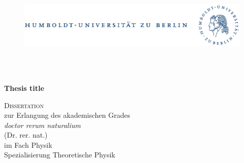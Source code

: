 \begin{titlepage}
  \begin{center}
    
    \vspace{-2cm}
    \begin{figure}[ht]
      \begin{center}
        \includegraphics[width=\textwidth]{figures/HUB-Emblem}
      \end{center}
    \end{figure}

    \begin{Large}
      \begin{center}
		\noindent\hrulefill \\
		\Large{}
		\vspace{-3mm}
		\noindent\hrulefill \\
      \end{center}
      \vspace{0.2cm}

      \begin{center}
          \noindent\Large{\textbf{Thesis title}}\\
      \end{center}
     \end{Large}
    
    \begin{large}
      \begin{center}
	\vspace{0.5cm} \textsc{Dissertation}\\ 
	\vspace{0.5cm} zur Erlangung des akademischen Grades \\ 
    \vspace{0.2cm}
    \textit{doctor rerum naturalium}\\
    (Dr. rer. nat.)\\
    \vspace{0.2cm}
    im Fach Physik\\
    Spezialisierung Theoretische Physik
      \end{center}
    \end{large}


\end{center}
\end{titlepage}
